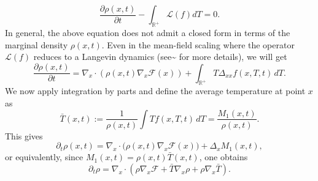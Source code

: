 \documentclass[10pt,a4paper]{article}
\theoremstyle{theorem}
\newcommand{\lp}{\reflectbox{$'$}}
\numberwithin{equation}{section}
\begin{document}
\begin{equation}
\label{eq:rho}
\frac{\partial \rho(x,t)}{\partial t}-\int_{\mathbb{R}^+}\mathcal{L}(f)dT=0.
\end{equation}
In general, the above equation does not admit a closed form in terms of the marginal density $\rho(x,t)$. Even in the mean-field scaling where the operator $\mathcal{L}(f)$ reduces to a Langevin dynamics (see^^>\cite{pareschi_optimization_2024} for more details), we will get 
\[
\frac{\partial \rho(x,t)}{\partial t} = \nabla_x \cdot \left(\rho(x,t)\nabla_x \mathcal{F}(x) \right) + \int_{\mathbb{R}^+} T\Delta_{xx} f(x,T,t)\,dT.
\]
We now apply integration by parts and define the average temperature at point \(x\) as
\begin{equation}
\bar{T}(x,t) := \frac{1}{\rho(x,t)} \int T f(x,T,t) \, dT = \frac{M_1(x,t)}{\rho(x,t)}.
\end{equation}
This gives
\begin{equation}
\partial_t\rho(x,t)
=
\nabla_x\cdot\big(\rho(x,t)\nabla_x\mathcal F(x)\big)
+
\Delta_x M_1(x,t),
\end{equation}
or equivalently, since \(M_1(x,t)=\rho(x,t)\bar T(x,t)\), one obtains
\begin{equation}
\partial_t\rho
=
\nabla_x\cdot\left(
\rho\nabla_x\mathcal F
+
\bar T\nabla_x\rho
+
\rho\nabla_x\bar T
\right).
\end{equation}
\end{document}
